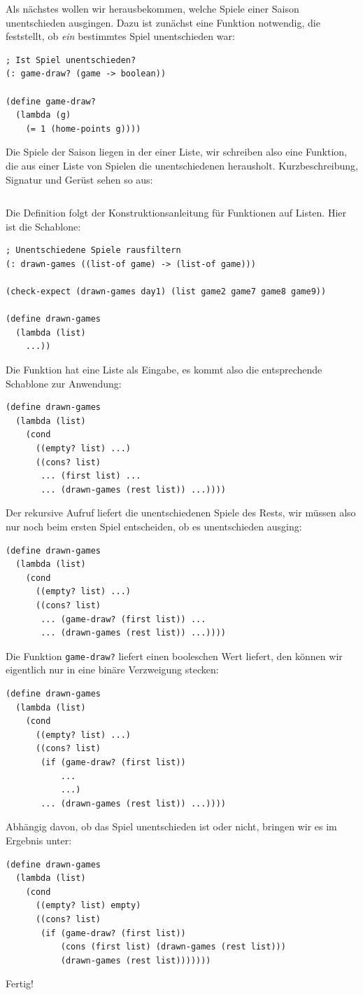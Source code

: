 Als nächstes wollen wir herausbekommen, welche Spiele einer Saison
unentschieden ausgingen.  Dazu ist zunächst eine Funktion notwendig,
die feststellt, ob \emph{ein} bestimmtes Spiel unentschieden war:
%
\begin{lstlisting}
; Ist Spiel unentschieden?
(: game-draw? (game -> boolean))

(define game-draw?
  (lambda (g)
    (= 1 (home-points g))))
\end{lstlisting}
%
Die Spiele der Saison liegen in der einer Liste, wir schreiben also eine
Funktion, die aus einer Liste von Spielen die
unentschiedenen herausholt.  Kurzbeschreibung, Signatur und Gerüst
sehen so aus:
%
\begin{lstlisting}

\end{lstlisting}
%
Die Definition folgt der Konstruktionsanleitung für Funktionen auf Listen.
Hier ist die Schablone:
%
\begin{lstlisting}
; Unentschiedene Spiele rausfiltern
(: drawn-games ((list-of game) -> (list-of game)))

(check-expect (drawn-games day1) (list game2 game7 game8 game9))

(define drawn-games
  (lambda (list)
    ...))
\end{lstlisting}
%
Die Funktion hat eine Liste als Eingabe, es kommt also die
entsprechende Schablone zur Anwendung:
%
\begin{lstlisting}
(define drawn-games
  (lambda (list)
    (cond
      ((empty? list) ...)
      ((cons? list)
       ... (first list) ...
       ... (drawn-games (rest list)) ...))))
\end{lstlisting}
%
Der rekursive Aufruf liefert die unentschiedenen Spiele des Rests, wir
müssen also nur noch beim ersten Spiel entscheiden, ob es
unentschieden ausging:
%
\begin{lstlisting}
(define drawn-games
  (lambda (list)
    (cond
      ((empty? list) ...)
      ((cons? list)
       ... (game-draw? (first list)) ...
       ... (drawn-games (rest list)) ...))))
\end{lstlisting}
%
Die Funktion \lstinline{game-draw?} liefert einen booleschen Wert
liefert, den können wir eigentlich nur in eine binäre Verzweigung stecken:
%
\begin{lstlisting}
(define drawn-games
  (lambda (list)
    (cond
      ((empty? list) ...)
      ((cons? list)
       (if (game-draw? (first list))
           ...
           ...)
       ... (drawn-games (rest list)) ...))))
\end{lstlisting}
%
Abhängig davon, ob das Spiel unentschieden ist oder nicht, bringen wir
es im Ergebnis unter:
%
\begin{lstlisting}
(define drawn-games
  (lambda (list)
    (cond
      ((empty? list) empty)
      ((cons? list)
       (if (game-draw? (first list))
           (cons (first list) (drawn-games (rest list)))
           (drawn-games (rest list)))))))
\end{lstlisting}
%
Fertig!

